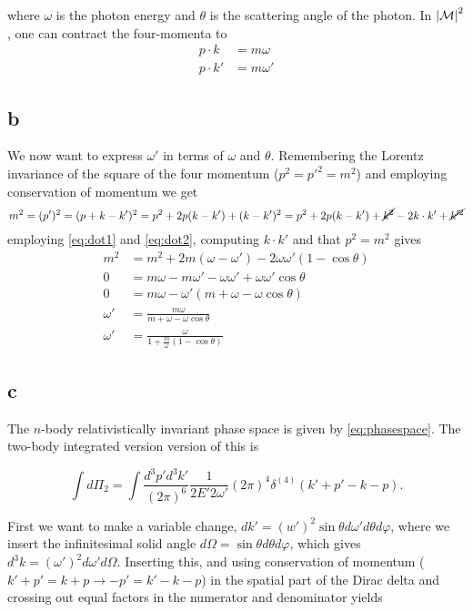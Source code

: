 \documentclass[11pt, a4paper]{amsart}
\begin{document}
where $\omega$ is the photon energy and $\theta$ is the scattering angle of the photon. In $\abs{\mathcal{M}}^2$, one can contract the four-momenta to
\begin{align}
p \cdot k \   &= m \omega \label{eq:dot1}\\
p \cdot k' &= m \omega' \label{eq:dot2}
\end{align}

\subsection*{b}
We now want to express $\omega'$ in terms of $\omega$ and $\theta$. Remembering the Lorentz invariance of the square of the four momentum ($p^2 = p'^2 = m^2$) and employing conservation of momentum we get
\begin{equation}
m^2 = (p')^2 = (p + k - k')^2 = p^2 + 2p(k-k') + (k -k')^2 = p^2 + 2p(k-k') + \cancel{k^2} - 2k\cdot k' + \cancel{k'^2}
\end{equation}
employing \autoref{eq:dot1} and \autoref{eq:dot2}, computing $k\cdot k'$ and that $p^2 = m^2$ gives
\begin{align}
  m^2 &= m^2 + 2m(\omega - \omega') - 2\omega\omega'(1 - \cos \theta) \nonumber \\
       0 &= m\omega -m\omega' - \omega\omega' + \omega\omega'\cos \theta \nonumber \\
       0 &=m\omega - \omega'(m + \omega - \omega\cos\theta) \nonumber \\
       \omega' &= \frac{m\omega}{m + \omega - \omega\cos\theta} \nonumber \\
       \omega' &= \frac{\omega}{1 + \frac{m}{\omega}(1-\cos\theta)} \label{eq:omegaprime}
\end{align}

\subsection*{c}
The $n$-body relativistically invariant phase space is given by \autoref{eq:phasespace}. The two-body integrated version version of this is

\begin{equation}
\int d\Pi_2 = \int \frac{d^3p' d^3k'}{(2\pi)^6} \frac{1}{2E'2\omega'} (2\pi)^4 \delta^{(4)}(k' + p' - k - p).
\end{equation}

First we want to make a variable change, $dk' = (w')^2\sin\theta d\omega' d\theta d\varphi$, where we insert the infinitesimal solid angle $d\Omega = \sin\theta d\theta d\varphi$, which gives $d^3k = (\omega')^2 d\omega' d\Omega$. Inserting this, and using conservation of momentum ($k' + p' = k + p \rightarrow -p' = k' - k -p$)  in the spatial part of the Dirac delta and crossing out equal factors in the numerator and denominator yields
\end{document}

